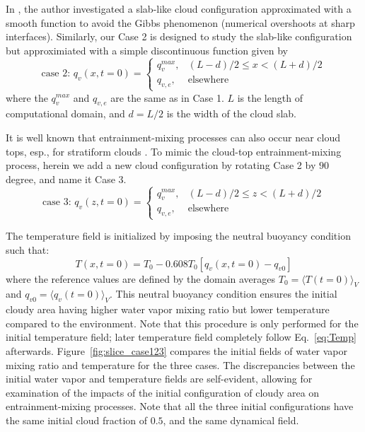\documentclass[draft,jgrga]{AGUTeX}
\newcommand{\Eq}[1]{Eq.~\eqref{#1}} \newcommand{\Fig}[1]{Figure~\ref{#1}}
\begin{document}
\begin{article}
In \cite{Kumar11}, the author investigated a slab-like cloud configuration approximated with a smooth function to avoid the Gibbs phenomenon (numerical overshoots at sharp interfaces). Similarly, our Case 2 is designed to study the slab-like configuration but approximiated with a simple discontinuous function given by
\begin{equation}
\mbox{case 2: } q_v(x,t=0) = 
\left\{\begin{array}{lr}
q_v^{max}, & (L-d)/2 \le x < (L+d)/2\\
q_{v,e}, & \mbox{elsewhere}
\end{array}\right.\label{case2}
\end{equation}
where the $q_v^{max}$ and $q_{v,e}$ are the same as in Case 1.
$L$ is the length of computational domain, and $d = L/2$ is the width of the cloud slab.

It is well known that entrainment-mixing processes can also occur near cloud tops, esp., for stratiform clouds \cite{Lu2011, Yum2015}. To mimic the cloud-top entrainment-mixing process, herein we add a new cloud configuration by rotating Case 2 by $90$ degree, and name it Case 3.
\begin{equation}
\mbox{case 3: } q_v(z,t=0) = 
\left\{\begin{array}{lr}
q_v^{max}, & (L-d)/2 \le z < (L+d)/2\\
q_{v,e}, & \mbox{elsewhere}
\end{array}\right.\label{case3}
\end{equation}

The temperature field is initialized by imposing the neutral buoyancy condition \cite{Kumar14} such that:
\begin{equation}
T(x,t = 0) = T_0 - 0.608T_0[q_v(x,t = 0) - q_{v0}]
\end{equation}
where the reference values are defined by the domain averages $T_0 = \langle T(t=0)\rangle_V$ and $q_{v0} = \langle q_v(t=0)\rangle_V$. This neutral buoyancy condition ensures the initial cloudy area having higher water vapor mixing ratio but lower temperature compared to the environment. Note that this procedure is only performed for the initial temperature field; later temperature field completely follow \Eq{eq:Temp} afterwards. \Fig{fig:slice_case123} compares the initial fields of water vapor 
mixing ratio and temperature for the three cases. The discrepancies between the initial water vapor 
and temperature fields are self-evident, allowing for examination of the impacts of the initial 
configuration of cloudy area on entrainment-mixing processes. Note that all the three initial 
configurations have the same initial cloud fraction of $0.5$, and the same dynamical field.


\end{article}
\end{document}
